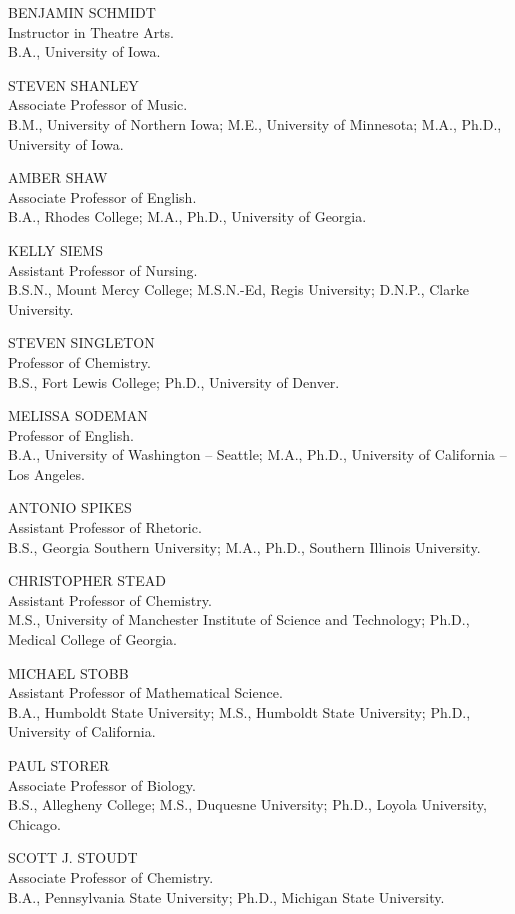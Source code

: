 \documentclass[
  letterpaper,
]{scrbook}
\begin{document}
BENJAMIN SCHMIDT\\
Instructor in Theatre Arts.\\
B.A., University of Iowa.

STEVEN SHANLEY\\
Associate Professor of Music.\\
B.M., University of Northern Iowa; M.E., University of Minnesota; M.A.,
Ph.D., University of Iowa.

AMBER SHAW\\
Associate Professor of English.\\
B.A., Rhodes College; M.A., Ph.D., University of Georgia.

KELLY SIEMS\\
Assistant Professor of Nursing.\\
B.S.N., Mount Mercy College; M.S.N.-Ed, Regis University; D.N.P., Clarke
University.

STEVEN SINGLETON\\
Professor of Chemistry.\\
B.S., Fort Lewis College; Ph.D., University of Denver.

MELISSA SODEMAN\\
Professor of English.\\
B.A., University of Washington -- Seattle; M.A., Ph.D., University of
California -- Los Angeles.

ANTONIO SPIKES\\
Assistant Professor of Rhetoric.\\
B.S., Georgia Southern University; M.A., Ph.D., Southern Illinois
University.

CHRISTOPHER STEAD\\
Assistant Professor of Chemistry.\\
M.S., University of Manchester Institute of Science and Technology;
Ph.D., Medical College of Georgia.

MICHAEL STOBB\\
Assistant Professor of Mathematical Science.\\
B.A., Humboldt State University; M.S., Humboldt State University; Ph.D.,
University of California.

PAUL STORER\\
Associate Professor of Biology.\\
B.S., Allegheny College; M.S., Duquesne University; Ph.D., Loyola
University, Chicago.

SCOTT J. STOUDT\\
Associate Professor of Chemistry.\\
B.A., Pennsylvania State University; Ph.D., Michigan State University.
\end{document}
